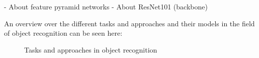 - About feature pyramid networks
- About ResNet101 (backbone)

An overview over the different tasks and approaches and their models  in the field of object recognition can be seen here:

\begin{figure}[!h]
	\caption{\label{fig:object-recognition} Tasks and approaches in object recognition}
\end{figure}

